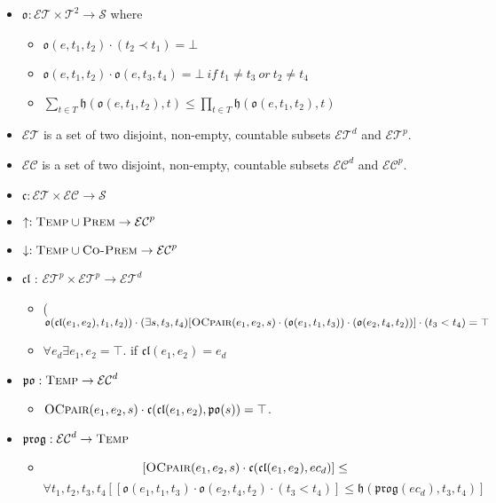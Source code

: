 \begin{itemize}
	\item $\mathfrak{o} : \mathcal{ET} \times \mathcal{T}^2 \to \mathcal{S}$ where
	      \begin{itemize}
		      \item $\mathfrak{o}(e, t_1, t_2) \cdot (t_2 \prec t_1) = \bot$
		      \item $\mathfrak{o}(e, t_1, t_2) \cdot \mathfrak{o}(e, t_3, t_4) = \bot  \ if \ t_1 \neq t_3 \ or \  t_2 \neq t_4$
		      \item $\displaystyle \sum_{t\in T} \mathfrak{h}( \mathfrak{o}(e, t_1, t_2), t) \leq \prod_{t\in T} \mathfrak{h}( \mathfrak{o}(e, t_1, t_2), t)$
	      \end{itemize}
	\item $\mathcal{ET}$ is a set of two disjoint, non-empty, countable subsets $\mathcal{ET}^d$ and $\mathcal{ET}^p$.
	\item $\mathcal{EC}$ is a set of two disjoint, non-empty, countable subsets $\mathcal{EC}^d$ and $\mathcal{EC}^p$.
	\item $\mathfrak{c} : \mathcal{ET} \times \mathcal{EC} \to \mathcal{S}$
	\item $\uparrow :  \textsc{Temp} \cup \textsc{Prem} \to \mathcal{EC}^p$
	\item $\downarrow :  \textsc{Temp} \cup \textsc{Co-Prem} \to \mathcal{EC}^p$
	\item $\mathfrak{cl}$ : $\mathcal{ET}^p \times \mathcal{ET}^p \to \mathcal{ET}^d$
	      \begin{itemize}
		      \item ($\mathfrak{o}(\mathfrak{cl}(e_1, e_2), t_1, t_2))  \cdot (\exists s, t_3, t_4)[
				            \textsc{OCpair}(e_1, e_2, s) \cdot (\mathfrak{o}(e_1, t_1, t_3)) \cdot (\mathfrak{o}(e_2, t_4, t_2))]  \cdot (t_3 < t_4) = \top$
		      \item $\forall e_d \exists e_1, e_2 = \top$. if $\mathfrak{cl}(e_1, e_2) = e_d$
	      \end{itemize}
	\item $\mathfrak{po} : \textsc{Temp} \to \mathcal{EC}^d$
	      \begin{itemize}
		      \item $\textsc{OCpair}(e_1, e_2, s) \cdot \mathfrak{c}(\mathfrak{cl}(e_1, e_2), \mathfrak{po}(s)) = \top$.
	      \end{itemize}
	\item $\mathfrak{prog} : \mathcal{EC}^d \to \textsc{Temp}$
	      \begin{itemize}
		      \item \[
			            [
					            \textsc{OCpair}(e_1, e_2, s) \cdot \mathfrak{c}(\mathfrak{cl} (e_1, e_2), ec_d)
				            ] \leq\]  \[\forall t_1, t_2, t_3, t_4 [[\mathfrak{o}(e_1, t_1, t_3) \cdot \mathfrak{o}(e_2, t_4, t_2)
					            \cdot (t_3 < t_4)] \leq \mathfrak{h}(\mathfrak{prog}(ec_d), t_3, t_4)]
		            \]
	      \end{itemize}
\end{itemize}

